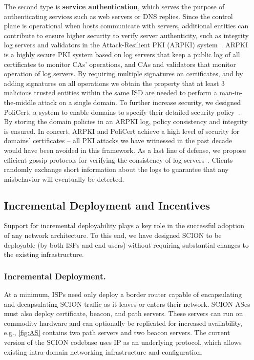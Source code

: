 \documentclass[a4paper]{llncs}
\newcommand\SCION{{\small\textsf{SCION}}\xspace}
\begin{document}
The second type is \textbf{service authentication}, which serves the purpose of
authenticating services such as web servers or DNS replies. Since the control
plane is operational when hosts communicate with servers, additional entities
can contribute to ensure higher security to verify server authenticity, such as
integrity log servers and validators in the Attack-Resilient PKI (ARPKI)
system~\cite{BCKPSS2014}. ARPKI is a highly secure PKI system based on log servers
that keep a public log of all certificates to monitor CAs' operations, and CAs
and validators that monitor operation of log servers. By requiring multiple
signatures on certificates, and by adding signatures on all operations we
obtain the property that at least 3 malicious trusted entities within the same
ISD are needed to perform a man-in-the-middle attack on a single domain.
To further increase security, we designed PoliCert, a system to enable domains
to specify their detailed security policy~\cite{SMP2014}. By storing the
domain policies in an ARPKI log, policy consistency and integrity is ensured.
In concert, ARPKI and PoliCert achieve a high level of security for domains'
certificates -- all PKI attacks we have witnessed in the past decade would have
been avoided in this framework.
As a last line of defense, we propose efficient gossip protocols for
verifying the consistency of log servers~\cite{laurent_gossip}. Clients
randomly exchange short information about the logs to guarantee that any
misbehavior will eventually be detected. 

\subsection{Incremental Deployment and Incentives}

Support for incremental deployability plays a key role in the successful
adoption of any network architecture. To this end, we have designed \SCION to
be deployable (by both ISPs and end users) without requiring substantial
changes to the existing infrastructure.

\subsubsection{Incremental Deployment.}
At a minimum, ISPs need only deploy a 
border router capable of encapsulating and decapsulating \SCION traffic as it 
leaves or enters their network. \SCION ASes must also deploy 
certificate, beacon, and path servers. These servers can run on commodity 
hardware and can optionally be replicated for 
increased availability, e.g., \autoref{fig:AS} contains two path
servers and two beacon servers. The current version of the \SCION
codebase uses IP as an underlying protocol, which allows existing
intra-domain networking infrastructure and configuration.
\end{document}
